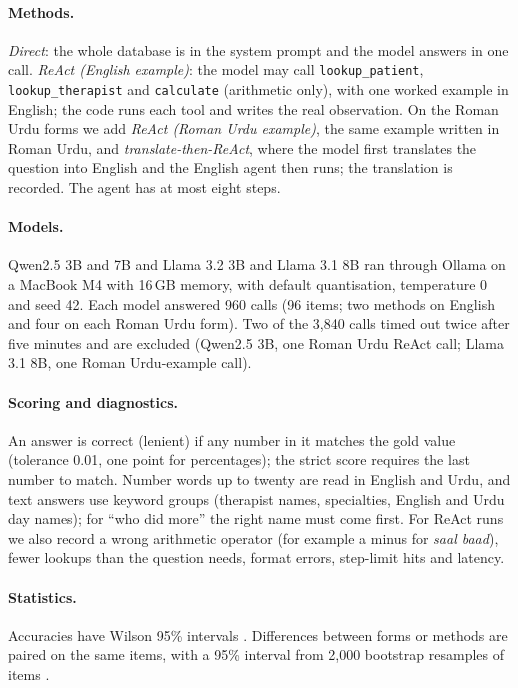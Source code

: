 \documentclass[11pt]{article}
\begin{document}
\paragraph{Methods.} \emph{Direct}: the whole database is in the system prompt and the model answers in one call. \emph{ReAct (English example)}: the model may call \texttt{lookup\_patient}, \texttt{lookup\_therapist} and \texttt{calculate} (arithmetic only), with one worked example in English; the code runs each tool and writes the real observation. On the Roman Urdu forms we add \emph{ReAct (Roman Urdu example)}, the same example written in Roman Urdu, and \emph{translate-then-ReAct}, where the model first translates the question into English and the English agent then runs; the translation is recorded. The agent has at most eight steps.

\paragraph{Models.} Qwen2.5 3B and 7B \citep{qwen2025qwen25} and Llama 3.2 3B and Llama 3.1 8B \citep{grattafiori2024llama3} ran through Ollama on a MacBook M4 with 16\,GB memory, with default quantisation, temperature 0 and seed 42. Each model answered 960 calls (96 items; two methods on English and four on each Roman Urdu form). Two of the 3,840 calls timed out twice after five minutes and are excluded (Qwen2.5 3B, one Roman Urdu ReAct call; Llama 3.1 8B, one Roman Urdu-example call).

\paragraph{Scoring and diagnostics.} An answer is correct (lenient) if any number in it matches the gold value (tolerance 0.01, one point for percentages); the strict score requires the last number to match. Number words up to twenty are read in English and Urdu, and text answers use keyword groups (therapist names, specialties, English and Urdu day names); for ``who did more'' the right name must come first. For ReAct runs we also record a wrong arithmetic operator (for example a minus for \emph{saal baad}), fewer lookups than the question needs, format errors, step-limit hits and latency.

\paragraph{Statistics.} Accuracies have Wilson 95\% intervals \citep{wilson1927}. Differences between forms or methods are paired on the same items, with a 95\% interval from 2,000 bootstrap resamples of items \citep{efron1979bootstrap}.
\end{document}

